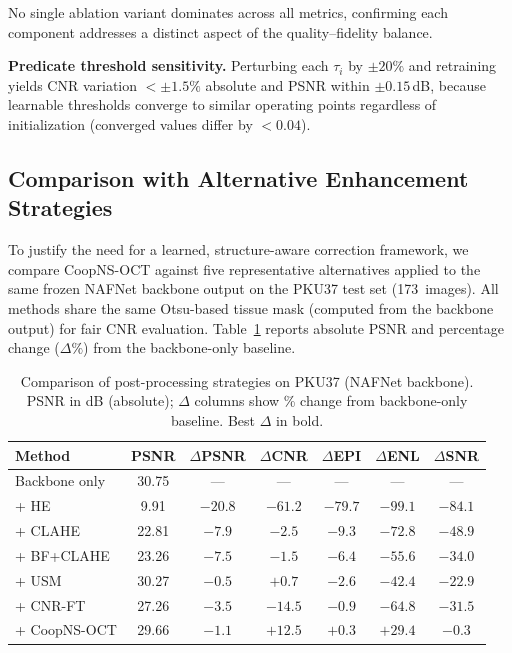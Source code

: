 \documentclass[journal,twoside,web]{ieeecolor}
\begin{document}
No single ablation variant dominates across all metrics, confirming each component addresses a distinct aspect of the quality--fidelity balance.

\textbf{Predicate threshold sensitivity.} Perturbing each $\tau_i$ by $\pm 20\%$ and retraining yields CNR variation $< \pm 1.5\%$ absolute and PSNR within $\pm 0.15$\,dB, because learnable thresholds converge to similar operating points regardless of initialization (converged values differ by $< 0.04$).

\subsection{Comparison with Alternative Enhancement Strategies}
\label{sec:comparison}

To justify the need for a learned, structure-aware correction framework, we compare CoopNS-OCT against five representative alternatives applied to the same frozen NAFNet backbone output on the PKU37 test set (173~images). All methods share the same Otsu-based tissue mask (computed from the backbone output) for fair CNR evaluation. Table~\ref{tab:comparison} reports absolute PSNR and percentage change ($\Delta\%$) from the backbone-only baseline.

\begin{table}[t]
\centering
\caption{Comparison of post-processing strategies on PKU37 (NAFNet backbone). PSNR in dB (absolute); $\Delta$ columns show \% change from backbone-only baseline. Best $\Delta$ in bold.}
\label{tab:comparison}
\setlength{\tabcolsep}{2pt}
\footnotesize
\begin{tabular}{lcccccc}
\toprule
Method & PSNR & $\Delta$PSNR & $\Delta$CNR & $\Delta$EPI & $\Delta$ENL & $\Delta$SNR \\
\midrule
Backbone only & 30.75 & --- & --- & --- & --- & --- \\
+ HE~\cite{gonzalez2018digital} & 9.91 & $-20.8$ & $-61.2$ & $-79.7$ & $-99.1$ & $-84.1$ \\
+ CLAHE~\cite{zuiderveld1994clahe} & 22.81 & $-7.9$ & $-2.5$ & $-9.3$ & $-72.8$ & $-48.9$ \\
+ BF+CLAHE~\cite{tomasi1998bilateral} & 23.26 & $-7.5$ & $-1.5$ & $-6.4$ & $-55.6$ & $-34.0$ \\
+ USM~\cite{polesel2000image} & 30.27 & $-0.5$ & $+0.7$ & $-2.6$ & $-42.4$ & $-22.9$ \\
+ CNR-FT & 27.26 & $-3.5$ & $-14.5$ & $-0.9$ & $-64.8$ & $-31.5$ \\
+ CoopNS-OCT & 29.66 & $-1.1$ & $\mathbf{+12.5}$ & $\mathbf{+0.3}$ & $\mathbf{+29.4}$ & $\mathbf{-0.3}$ \\
\bottomrule
\end{tabular}
\end{table}
\end{document}
